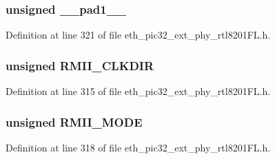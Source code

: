\subsubsection[{\+\_\+\+\_\+pad1\+\_\+\+\_\+}]{\setlength{\rightskip}{0pt plus 5cm}unsigned \+\_\+\+\_\+pad1\+\_\+\+\_\+}\label{union___r_m_i_i_m_o_d_e_s_e_t_t_i_ngbits__t_acaf2d0924a107ec6e8d2e31febaf66f9}


Definition at line 321 of file eth\+\_\+pic32\+\_\+ext\+\_\+phy\+\_\+rtl8201\+F\+L.\+h.

\hypertarget{union___r_m_i_i_m_o_d_e_s_e_t_t_i_ngbits__t_ad17f117721db788c71870376a243a508}{}
\subsubsection[{R\+M\+I\+I\+\_\+\+C\+L\+K\+D\+I\+R}]{\setlength{\rightskip}{0pt plus 5cm}unsigned R\+M\+I\+I\+\_\+\+C\+L\+K\+D\+I\+R}\label{union___r_m_i_i_m_o_d_e_s_e_t_t_i_ngbits__t_ad17f117721db788c71870376a243a508}


Definition at line 315 of file eth\+\_\+pic32\+\_\+ext\+\_\+phy\+\_\+rtl8201\+F\+L.\+h.

\hypertarget{union___r_m_i_i_m_o_d_e_s_e_t_t_i_ngbits__t_a20b8da6446fb0fd157b6fdeece4b4452}{}
\subsubsection[{R\+M\+I\+I\+\_\+\+M\+O\+D\+E}]{\setlength{\rightskip}{0pt plus 5cm}unsigned R\+M\+I\+I\+\_\+\+M\+O\+D\+E}\label{union___r_m_i_i_m_o_d_e_s_e_t_t_i_ngbits__t_a20b8da6446fb0fd157b6fdeece4b4452}


Definition at line 318 of file eth\+\_\+pic32\+\_\+ext\+\_\+phy\+\_\+rtl8201\+F\+L.\+h.

